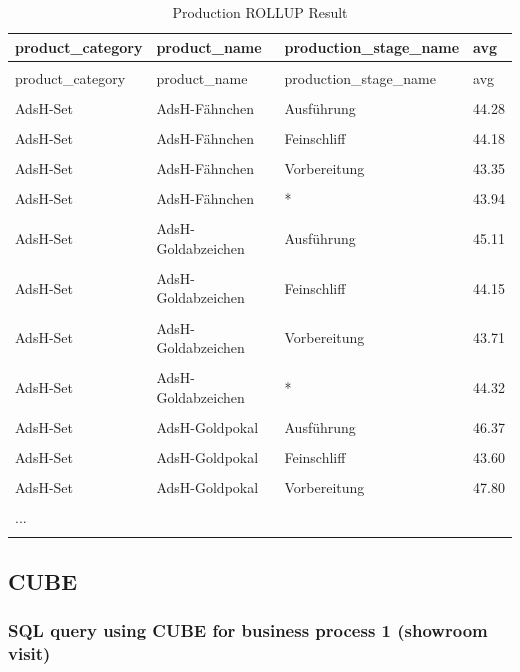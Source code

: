 \documentclass[letterpaper,12pt]{article}
\begin{document}
\begingroup
\renewcommand\arraystretch{0.5}
\begin{longtable}{p{4cm}p{4cm}p{4cm}p{4cm}}
        \caption{Production ROLLUP Result} \\
				product\_category & product\_name & production\_stage\_name & avg \\
        \endfirsthead \\
        product\_category & product\_name & production\_stage\_name & avg \\
        \endhead \\
AdsH-Set & AdsH-Fähnchen & Ausführung & 44.28 \\
\hline \\
AdsH-Set & AdsH-Fähnchen & Feinschliff & 44.18 \\
\hline \\
AdsH-Set & AdsH-Fähnchen & Vorbereitung & 43.35 \\
\hline \\
AdsH-Set & AdsH-Fähnchen & * & 43.94 \\
\hline \\
AdsH-Set & AdsH-Goldabzeichen & Ausführung & 45.11 \\
\hline \\
AdsH-Set & AdsH-Goldabzeichen & Feinschliff & 44.15 \\
\hline \\
AdsH-Set & AdsH-Goldabzeichen & Vorbereitung & 43.71 \\
\hline \\
AdsH-Set & AdsH-Goldabzeichen & * & 44.32 \\
\hline \\
AdsH-Set & AdsH-Goldpokal & Ausführung & 46.37 \\
\hline \\
AdsH-Set & AdsH-Goldpokal & Feinschliff & 43.60 \\
\hline \\
AdsH-Set & AdsH-Goldpokal & Vorbereitung & 47.80 \\
\hline \\
... \\
\hline \\
\end{longtable} 
\endgroup

\subsection{CUBE}

\subsubsection{SQL query using CUBE for business process 1 (showroom visit)}
\end{document}
